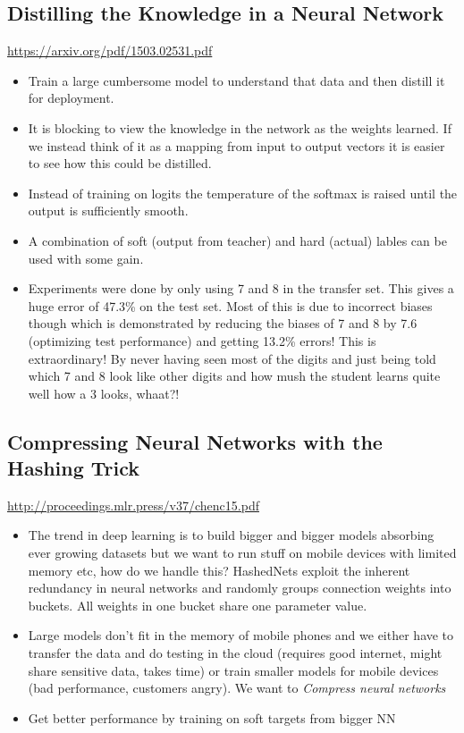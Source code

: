 \documentclass[11pt]{article}
\begin{document}
\subsection{Distilling the Knowledge in a Neural Network}
\label{sec:org72d8131}
\url{https://arxiv.org/pdf/1503.02531.pdf}
\begin{itemize}
\item Train a large cumbersome model to understand that data and then distill it for deployment.
\item It is blocking to view the knowledge in the network as the weights learned. If we instead think of it as a mapping from input to output vectors it is easier to see how this could be distilled.
\item Instead of training on logits the temperature of the softmax is raised until the output is sufficiently smooth.
\item A combination of soft (output from teacher) and hard (actual) lables can be used with some gain.
\item Experiments were done by only using 7 and 8 in the transfer set. This gives a huge error of 47.3\% on the test set. Most of this is due to incorrect biases though which is demonstrated by reducing the biases of 7 and 8 by 7.6 (optimizing test performance) and getting 13.2\% errors! This is extraordinary! By never having seen most of the digits and just being told which 7 and 8 look like other digits and how mush the student learns quite well how a 3 looks, whaat?!
\end{itemize}

\subsection{Compressing Neural Networks with the Hashing Trick}
\label{sec:org2799262}
\url{http://proceedings.mlr.press/v37/chenc15.pdf}
\begin{itemize}
\item The trend in deep learning is to build bigger and bigger models absorbing ever growing datasets but we want to run stuff on mobile devices with limited memory etc, how do we handle this? HashedNets exploit the inherent redundancy in neural networks and randomly groups connection weights into buckets. All weights in one bucket share one parameter value.
\item Large models don't fit in the memory of mobile phones and we either have to transfer the data and do testing in the cloud (requires good internet, might share sensitive data, takes time) or train smaller models for mobile devices (bad performance, customers angry). We want to \emph{Compress neural networks}
\item Get better performance by training on soft targets from bigger NN
\end{itemize}
\end{document}
